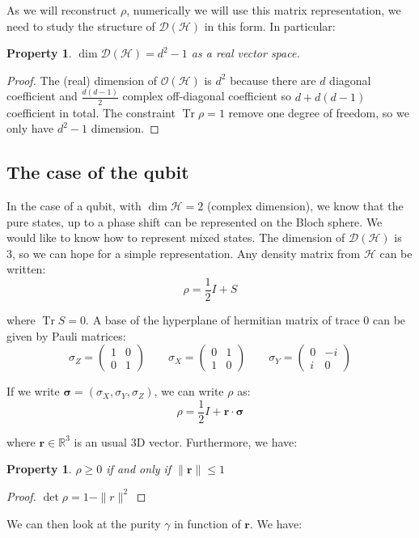 \documentclass[10pt,a4paper]{report}
\theoremstyle{plain}
\newtheorem{prop}[thm]{Property}
\theoremstyle{definition}
\theoremstyle{remark}
\newcommand{\R}{\ensuremath{\mathbb{R}}}
\renewcommand{\geq}{\geqslant}
\renewcommand{\leq}{\leqslant}
\newcommand{\mat}[1]{\begin{pmatrix}#1\end{pmatrix}}
\newcommand{\bs}{\boldsymbol}
\DeclareMathOperator{\Tr}{Tr}
\begin{document}
As we will reconstruct $\rho$, numerically we will use this matrix
representation, we need to study the structure of $\mathcal{D}(\mathcal{H})$ in
this form. In particular:

\begin{prop}
  $\dim \mathcal{D}(\mathcal{H}) = d^2 - 1 $ as a real vector space.
\end{prop}

\begin{proof}
  The (real) dimension of $\mathcal{O}(\mathcal{H})$ is $d^2$ because there are $d$ diagonal
  coefficient and $\frac {d(d-1)} 2$ complex off-diagonal coefficient so $d +
  d(d-1)$ coefficient in total. The constraint $\Tr \rho = 1$ remove one degree
  of freedom, so we only have $d^2 -1$ dimension.
\end{proof}

\subsection{The case of the qubit}

In the case of a qubit, with $\dim \mathcal{H} = 2$ (complex dimension), we know
that the pure states, up to a phase shift can be represented on the Bloch sphere. We
would like to know how to represent mixed states. The dimension of
$\mathcal{D}(\mathcal{H})$ is 3, so we can hope for a simple representation. Any
density matrix from $\mathcal{H}$ can be written:
\[\rho = \frac12I + S\]

where $\Tr S = 0$. A base of the hyperplane of hermitian matrix of trace $0$ can
be given by Pauli matrices:
\[\sigma_Z = \mat{1&0\\0&1} \quad \quad \sigma_X = \mat{0&1\\1&0} \quad \quad
  \sigma_Y = \mat{0&-i\\i&0}\]

If we write $\bs\sigma = (\sigma_X,\sigma_Y,\sigma_Z)$, we can write
$\rho$ as:
\[\rho = \frac12 I + \bs r \cdot \bs \sigma\]

where $\bs r \in \R^3$ is an usual 3D vector. Furthermore, we have:

\begin{prop}
  $\rho \geq 0$ if and only if $\|\bs r\| \leq 1$
\end{prop}

\begin{proof}
  $\det \rho = 1 - \|r\|^2$
\end{proof}

We can then look at the purity $\gamma$ in function of $\bs r$. We have:
\end{document}
